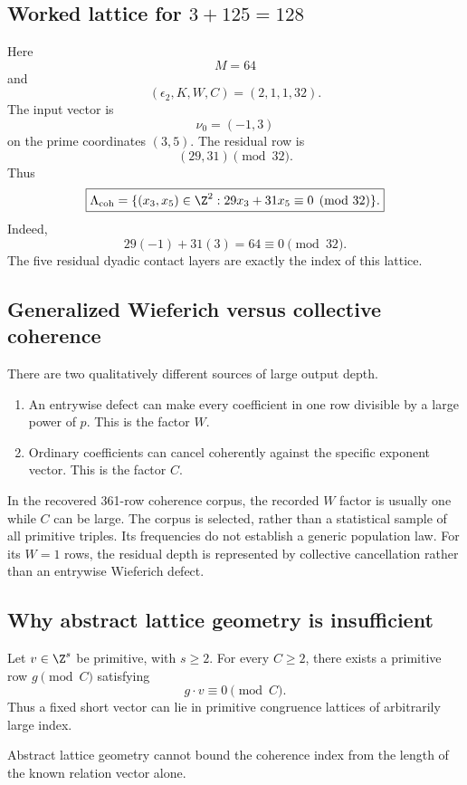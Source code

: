 \subsection{Worked lattice for \texorpdfstring{$3+125=128$}{3+125=128}}
Here
\[
 M=64
\]
and
\[
 (\epsilon_2,K,W,C)=(2,1,1,32).
\]
The input vector is
\[
 \nu_0=(-1,3)
\]
on the prime coordinates $(3,5)$. The residual row is
\[
 (29,31)\pmod{32}.
\]
Thus
\[
 \boxed{
 \Lambda_{\mathrm{coh}}
 =
 \{(x_3,x_5)\in\Z^2:29x_3+31x_5\equiv0\pmod{32}\}.
 }
\]
Indeed,
\[
 29(-1)+31(3)=64\equiv0\pmod{32}.
\]
The five residual dyadic contact layers are exactly the index of this lattice.

\subsection{Generalized Wieferich versus collective coherence}
There are two qualitatively different sources of large output depth.

\begin{enumerate}[leftmargin=1.5em]
\item An entrywise defect can make every coefficient in one row divisible by a large power of $p$. This is the factor $W$.
\item Ordinary coefficients can cancel coherently against the specific exponent vector. This is the factor $C$.
\end{enumerate}

In the recovered 361-row coherence corpus, the recorded $W$ factor is usually one while $C$ can be large. The corpus is selected, rather than a statistical sample of all primitive triples. Its frequencies do not establish a generic population law. For its $W=1$ rows, the residual depth is represented by collective cancellation rather than an entrywise Wieferich defect.

\subsection{Why abstract lattice geometry is insufficient}
Let $v\in\Z^s$ be primitive, with $s\ge2$. For every $C\ge2$, there exists a primitive row $g\pmod C$ satisfying
\[
 g\cdot v\equiv0\pmod C.
\]
Thus a fixed short vector can lie in primitive congruence lattices of arbitrarily large index.

\begin{theorem}
Abstract lattice geometry cannot bound the coherence index from the length of the known relation vector alone.
\end{theorem}

